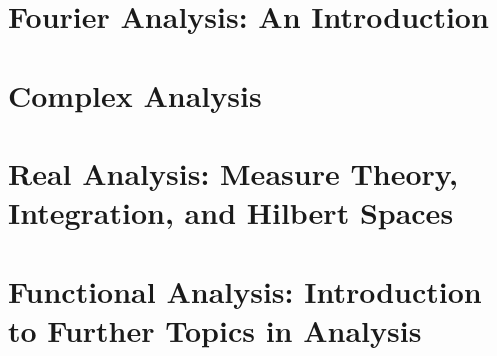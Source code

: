 \documentclass[10pt]{memoir}
\begin{document}
\part{Fourier Analysis: An Introduction}









\part{Complex Analysis}












\part{Real Analysis: Measure Theory, Integration, and Hilbert Spaces}








\part{Functional Analysis: Introduction to Further Topics in Analysis}








\end{document}
